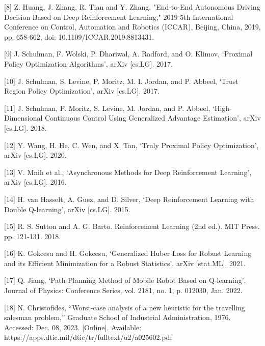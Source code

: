 \documentclass{article}
\begin{document}
        [8] Z. Huang, J. Zhang, R. Tian and Y. Zhang, "End-to-End Autonomous Driving Decision Based on Deep Reinforcement Learning," 2019 5th International Conference on Control, Automation and Robotics (ICCAR), Beijing, China, 2019, pp. 658-662, doi: 10.1109/ICCAR.2019.8813431.
	
	[9] J. Schulman, F. Wolski, P. Dhariwal, A. Radford, and O. Klimov, ‘Proximal Policy Optimization Algorithms’, arXiv [cs.LG]. 2017.
	
	[10] J. Schulman, S. Levine, P. Moritz, M. I. Jordan, and P. Abbeel, ‘Trust Region Policy Optimization’, arXiv [cs.LG]. 2017.
	
	[11] J. Schulman, P. Moritz, S. Levine, M. Jordan, and P. Abbeel, ‘High-Dimensional Continuous Control Using Generalized Advantage Estimation’, arXiv [cs.LG]. 2018.
	
	[12] Y. Wang, H. He, C. Wen, and X. Tan, ‘Truly Proximal Policy Optimization’, arXiv [cs.LG]. 2020.
	
	[13] V. Mnih et al., ‘Asynchronous Methods for Deep Reinforcement Learning’, arXiv [cs.LG]. 2016.
	
	[14] H. van Hasselt, A. Guez, and D. Silver, ‘Deep Reinforcement Learning with Double Q-learning’, arXiv [cs.LG]. 2015.
	
	[15] R. S. Sutton and A. G. Barto. Reinforcement Learning (2nd ed.). MIT Press. pp. 121-131. 2018.
	
	[16] K. Gokcesu and H. Gokcesu, ‘Generalized Huber Loss for Robust Learning and its Efficient Minimization for a Robust Statistics’, arXiv [stat.ML]. 2021.
	
	[17] Q. Jiang, ‘Path Planning Method of Mobile Robot Based on Q-learning’, Journal of Physics: Conference Series, vol. 2181, no. 1, p. 012030, Jan. 2022.
	
	[18] N. Christofides, “Worst-case analysis of a new heuristic for the travelling salesman problem,” Graduate School of Industrial Administration, 1976. Accessed: Dec. 08, 2023. [Online]. Available: https://apps.dtic.mil/dtic/tr/fulltext/u2/a025602.pdf
	
\end{document}
